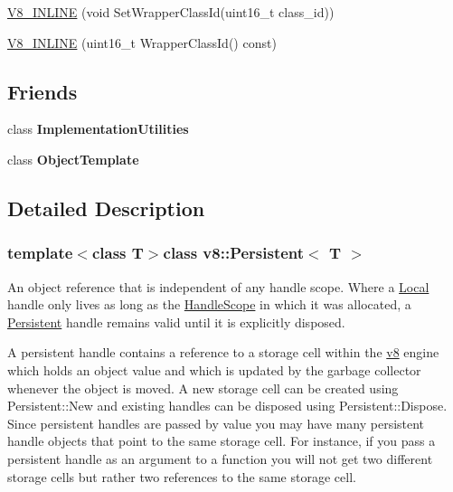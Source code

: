 \begin{DoxyCompactItemize}
\item 
\hyperlink{classv8_1_1_persistent_a57a08d23ba324fee6b86e4df808e1d6d}{V8\+\_\+\+I\+N\+L\+I\+N\+E} (void Set\+Wrapper\+Class\+Id(uint16\+\_\+t class\+\_\+id))
\item 
\hyperlink{classv8_1_1_persistent_aea12008dfeca52acd8e687187c25e4b7}{V8\+\_\+\+I\+N\+L\+I\+N\+E} (uint16\+\_\+t Wrapper\+Class\+Id() const)
\end{DoxyCompactItemize}
\subsection*{Friends}
\begin{DoxyCompactItemize}
\item 
\hypertarget{classv8_1_1_persistent_ac7b520085953e146d849e05253267f72}{}class {\bfseries Implementation\+Utilities}\label{classv8_1_1_persistent_ac7b520085953e146d849e05253267f72}

\item 
\hypertarget{classv8_1_1_persistent_a4d28646409234f556983be8a96c06424}{}class {\bfseries Object\+Template}\label{classv8_1_1_persistent_a4d28646409234f556983be8a96c06424}

\end{DoxyCompactItemize}


\subsection{Detailed Description}
\subsubsection*{template$<$class T$>$class v8\+::\+Persistent$<$ T $>$}

An object reference that is independent of any handle scope. Where a \hyperlink{classv8_1_1_local}{Local} handle only lives as long as the \hyperlink{classv8_1_1_handle_scope}{Handle\+Scope} in which it was allocated, a \hyperlink{classv8_1_1_persistent}{Persistent} handle remains valid until it is explicitly disposed.

A persistent handle contains a reference to a storage cell within the \hyperlink{namespacev8}{v8} engine which holds an object value and which is updated by the garbage collector whenever the object is moved. A new storage cell can be created using Persistent\+::\+New and existing handles can be disposed using Persistent\+::\+Dispose. Since persistent handles are passed by value you may have many persistent handle objects that point to the same storage cell. For instance, if you pass a persistent handle as an argument to a function you will not get two different storage cells but rather two references to the same storage cell. 

